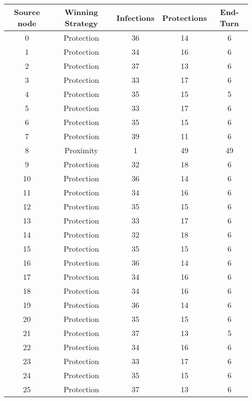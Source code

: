 \documentclass[results.tex]{subfiles}
\begin{document}
\begin{center}
  \begin{tabular}{| c || c | c | c | c |}
    \hline
    {\bfseries Source node} & {\bfseries Winning Strategy} & {\bfseries Infections} & {\bfseries Protections} & {\bfseries End-Turn} \\  %
    \hline\hline
    0 & Protection & 36 & 14 & 6 \\ 
    \hline
    1 & Protection & 34 & 16 & 6 \\ 
    \hline
    2 & Protection & 37 & 13 & 6 \\ 
    \hline
    3 & Protection & 33 & 17 & 6 \\ 
    \hline
    4 & Protection & 35 & 15 & 5 \\ 
    \hline
    5 & Protection & 33 & 17 & 6 \\ 
    \hline
    6 & Protection & 35 & 15 & 6 \\ 
    \hline
    7 & Protection & 39 & 11 & 6 \\ 
    \hline
    8 & Proximity & 1 & 49 & 49 \\ 
    \hline
    9 & Protection & 32 & 18 & 6 \\ 
    \hline
    10 & Protection & 36 & 14 & 6 \\ 
    \hline
    11 & Protection & 34 & 16 & 6 \\ 
    \hline
    12 & Protection & 35 & 15 & 6 \\ 
    \hline
    13 & Protection & 33 & 17 & 6 \\ 
    \hline
    14 & Protection & 32 & 18 & 6 \\ 
    \hline
    15 & Protection & 35 & 15 & 6 \\ 
    \hline
    16 & Protection & 36 & 14 & 6 \\ 
    \hline
    17 & Protection & 34 & 16 & 6 \\ 
    \hline
    18 & Protection & 34 & 16 & 6 \\ 
    \hline
    19 & Protection & 36 & 14 & 6 \\ 
    \hline
    20 & Protection & 35 & 15 & 6 \\ 
    \hline
    21 & Protection & 37 & 13 & 5 \\ 
    \hline
    22 & Protection & 34 & 16 & 6 \\ 
    \hline
    23 & Protection & 33 & 17 & 6 \\ 
    \hline
    24 & Protection & 35 & 15 & 6 \\ 
    \hline
    25 & Protection & 37 & 13 & 6 \\ 

\end{tabular}
\end{center}
\end{document}
